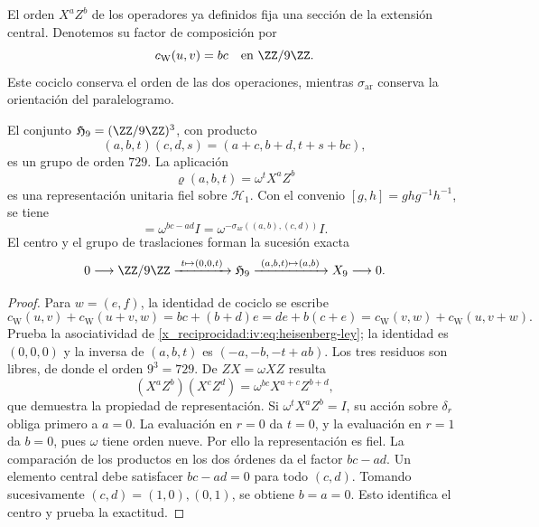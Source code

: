 El orden \(X^aZ^b\) de los operadores ya definidos fija una sección
de la extensión central. Denotemos su factor de composición por
\begin{equation}
 c_{\mathrm W}(u,v)=bc\quad\text{en }\ZZ/9\ZZ.
 \label{x_reciprocidad:iv:eq:weyl-cociclo-polarizado}
\end{equation}
Este cociclo conserva el orden de las dos operaciones, mientras
\(\sigma_{\mathrm{ar}}\) conserva la orientación del paralelogramo.

\begin{proposition}
\label{x_reciprocidad:iv:prop:heisenberg-orientado}
El conjunto \(\mathfrak H_9=(\ZZ/9\ZZ)^3\), con producto
\begin{equation}
 (a,b,t)(c,d,s)=(a+c,b+d,t+s+bc),
 \label{x_reciprocidad:iv:eq:heisenberg-ley}
\end{equation}
es un grupo de orden \(729\). La aplicación
\[
 \varrho(a,b,t)=\omega^tX^aZ^b
\]
es una representación unitaria fiel sobre \(\mathcal H_1\).
Con el convenio \([g,h]=ghg^{-1}h^{-1}\), se tiene
\begin{equation}
 [\varrho(a,b,0),\varrho(c,d,0)]
 =\omega^{bc-ad}I
 =\omega^{-\sigma_{\mathrm{ar}}((a,b),(c,d))}I.
 \label{x_reciprocidad:iv:eq:weyl-conmutador-orientado}
\end{equation}
El centro y el grupo de traslaciones forman la sucesión exacta
\[
 0\longrightarrow\ZZ/9\ZZ
 \xrightarrow{\ t\mapsto(0,0,t)\ }\mathfrak H_9
 \xrightarrow{\ (a,b,t)\mapsto(a,b)\ }X_9
 \longrightarrow0.
\]
\end{proposition}
\begin{proof}
Para \(w=(e,f)\), la identidad de cociclo se escribe
\[
 c_{\mathrm W}(u,v)+c_{\mathrm W}(u+v,w)
 =bc+(b+d)e
 =de+b(c+e)
 =c_{\mathrm W}(v,w)+c_{\mathrm W}(u,v+w).
\]
Prueba la asociatividad de \eqref{x_reciprocidad:iv:eq:heisenberg-ley}; la identidad
es \((0,0,0)\) y la inversa de \((a,b,t)\) es
\((-a,-b,-t+ab)\). Los tres residuos son libres, de donde el orden
\(9^3=729\). De \(ZX=\omega XZ\) resulta
\[
 (X^aZ^b)(X^cZ^d)=\omega^{bc}X^{a+c}Z^{b+d},
\]
que demuestra la propiedad de representación. Si
\(\omega^tX^aZ^b=I\), su acción sobre \(\delta_r\) obliga primero
a \(a=0\). La evaluación en \(r=0\) da \(t=0\), y la
evaluación en \(r=1\) da \(b=0\), pues \(\omega\) tiene orden
nueve. Por ello la representación es fiel. La comparación de los
productos en los dos órdenes da el factor \(bc-ad\).
Un elemento central debe satisfacer \(bc-ad=0\) para todo \((c,d)\).
Tomando sucesivamente \((c,d)=(1,0),(0,1)\), se obtiene
\(b=a=0\). Esto identifica el centro y prueba la exactitud.
\end{proof}

